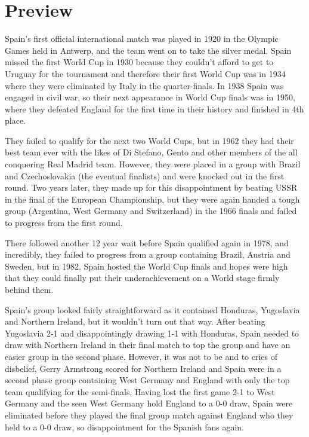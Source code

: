 \section{Preview}
Spain's first official international match was played in 1920 in the Olympic 
Games held in Antwerp, and the team went on to take the silver medal. Spain
missed the first World Cup in 1930 because they couldn't afford to get to 
Uruguay for the tournament and therefore their first World Cup was in 1934 
where they were eliminated by Italy in the quarter-finals. In 1938 Spain was 
engaged in civil war, so their next appearance in World Cup finals was in 1950,
where they defeated England for the first time in their history and finished in
4th place.

They failed to qualify for the next two World Cups, but in 1962 they had their 
best team ever with the likes of Di Stefano, Gento and other members of the all
conquering Real Madrid team. However, they were placed in a group with Brazil
and Czechoslovakia (the eventual finalists) and were knocked out in the first
round. Two years later, they made up for this disappointment by beating USSR in
the final of the European Championship, but they were again handed a tough 
group (Argentina, West Germany and Switzerland) in the 1966 finals and failed 
to progress from the first round.

There followed another 12 year wait before Spain qualified again in 1978, and 
incredibly, they failed to progress from a group containing Brazil, Austria and
Sweden, but in 1982, Spain hosted the World Cup finals and hopes were high that
they could finally put their underachievement on a World stage firmly behind
them.

Spain's group looked fairly straightforward as it contained Honduras, 
Yugoslavia and Northern Ireland, but it wouldn't turn out that way. After 
beating Yugoslavia 2-1 and disappointingly drawing 1-1 with Honduras, Spain 
needed to draw with Northern Ireland in their final match to top the group and 
have an easier group in the second phase. However, it was not to be and to 
cries of disbelief, Gerry Armstrong scored for Northern Ireland and Spain were 
in a second phase group containing West Germany and England with only the top 
team qualifying for the semi-finals. Having lost the first game 2-1 to West 
Germany and the seen West Germany hold England to a 0-0 draw, Spain were 
eliminated before they played the final group match against England who they 
held to a 0-0 draw, so disappointment for the Spanish fans again.

